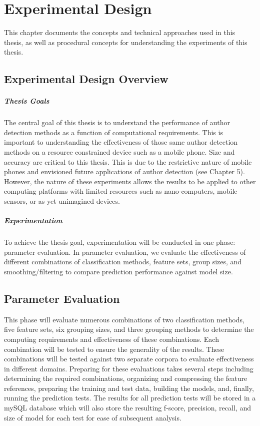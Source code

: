 \chapter{Experimental Design}
This chapter documents the concepts and technical approaches used in this thesis, as well as procedural concepts for understanding the experiments of this thesis.

\section{Experimental Design Overview}
	\paragraph{Thesis Goals} The central goal of this thesis is to understand the performance of author detection methods as a function of computational requirements. This is important to understanding the effectiveness of those same author detection methods on a resource constrained device such as a mobile phone.  Size and accuracy are critical to this thesis. This is due to the restrictive nature of mobile phones and envisioned future applications of author detection (see Chapter 5).  However, the nature of these experiments allows the results to be applied to other computing platforms with limited resources such as nano-computers, mobile sensors, or as yet unimagined devices.
	\paragraph{Experimentation}To achieve the thesis goal, experimentation will be conducted in one phase: parameter evaluation.  In parameter evaluation, we evaluate the effectiveness of different combinations of classification methods, feature sets, group sizes, and smoothing/filtering to compare prediction performance against model size.  

\section{Parameter Evaluation} This phase will evaluate numerous combinations of two classification methods, five feature sets, six grouping sizes, and three grouping methods to determine the computing requirements and effectiveness of these combinations.  Each combination will be tested to ensure the generality of the results. These combinations will be tested against two separate corpora to evaluate effectiveness in different domains. Preparing for these evaluations takes several steps including determining the required combinations, organizing and compressing the feature references, preparing the training and test data, building the models, and, finally, running the prediction tests.  The results for all prediction tests will be stored in a mySQL database which will also store the resulting f-score, precision, recall, and size of model for each test for ease of subsequent analysis.

